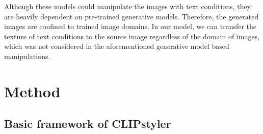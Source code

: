 \documentclass[10pt,twocolumn,letterpaper]{article}
\begin{document}
Although these models could manipulate the images with text conditions, they are heavily dependent on pre-trained generative models. Therefore, the generated images are confined to trained image domains.  In our model, we can transfer the texture of text conditions to the source image regardless of the domain of images, which was not considered in the aforementioned generative model based manipulations.  





%

\section{Method}
\subsection{Basic framework of CLIPstyler}
\end{document}
